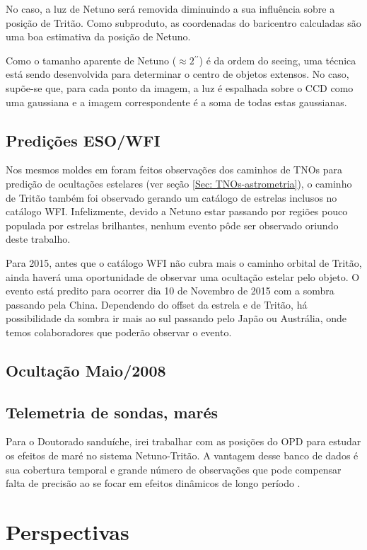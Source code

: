 \documentclass[12pt,a4paper]{monografia}
\newcommand{\arcsec}{\ensuremath{^{\prime\prime}}}%
\begin{document}
No caso, a luz de Netuno será removida diminuindo a sua influência sobre a posição de Tritão. Como subproduto, as coordenadas do baricentro calculadas são uma boa estimativa da posição de Netuno.

Como o tamanho aparente de Netuno ($\approx 2\arcsec$) é da ordem do seeing, uma técnica está sendo desenvolvida para determinar o centro de objetos extensos. No caso, supõe-se que, para cada ponto da imagem, a luz é espalhada sobre o CCD como uma gaussiana e a imagem correspondente é a soma de todas estas gaussianas.


\section{Predições ESO/WFI}
\label{Sec: Netuno-predic}

\indent \indent Nos mesmos moldes em foram feitos observações dos caminhos de TNOs para predição de ocultações estelares (ver seção \ref{Sec: TNOs-astrometria}), o caminho de Tritão também foi observado gerando um catálogo de estrelas inclusos no catálogo WFI. Infelizmente, devido a Netuno estar passando por regiões pouco populada por estrelas brilhantes, nenhum evento pôde ser observado oriundo deste trabalho.

Para 2015, antes que o catálogo WFI não cubra mais o caminho orbital de Tritão, ainda haverá uma oportunidade de observar uma ocultação estelar pelo objeto. O evento está predito para ocorrer dia 10 de Novembro de 2015 com a sombra passando pela China. Dependendo do offset da estrela e de Tritão, há possibilidade da sombra ir mais ao sul passando pelo Japão ou Austrália, onde temos colaboradores que poderão observar o evento.


\section{Ocultação Maio/2008}
\label{Sec: Netuno-maio2008}


\section{Telemetria de sondas, marés}
\label{Sec: Netuno-mares}

\indent \indent Para o Doutorado sanduíche, irei trabalhar com as posições do OPD para estudar os efeitos de maré no sistema Netuno-Tritão. A vantagem desse banco de dados é sua cobertura temporal e grande número de observações que pode compensar falta de precisão ao se focar em efeitos dinâmicos de longo período \citep{Lainey2012}.


\chapter{Perspectivas}
\label{Cap: perspectivas}

\indent \indent 




\end{document}
